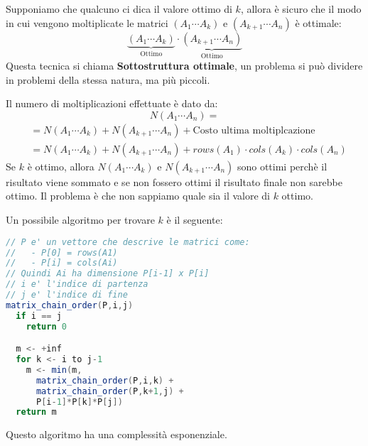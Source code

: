 \documentclass[a4paper]{article}
\begin{document}
\vspace{1em}
\noindent
Supponiamo che qualcuno ci dica il valore ottimo di \( k \), allora è sicuro che
il modo in cui vengono moltiplicate le matrici \( (A_1 \cdots A_k) \) e 
\( (A_{k+1} \cdots A_n) \) è ottimale:
\[
  \underbrace{\left( A_1 \cdots A_k \right)}_{\text{Ottimo}} \cdot 
  \underbrace{\left( A_{k+1} \cdots A_n \right)}_{\text{Ottimo}}
\] 
Questa tecnica si chiama \textbf{Sottostruttura ottimale}, un problema si può dividere in
problemi della stessa natura, ma più piccoli.

\vspace{1em}
\noindent
Il numero di moltiplicazioni effettuate è dato da:
\[
  N\left( A_1 \cdots A_n \right) =
\] 
\[
  \begin{aligned}
         &= N\left( A_1 \cdots A_k \right) +
         N\left( A_{k+1} \cdots A_n \right) +
         \text{Costo ultima moltiplcazione}
         \\
         &= N\left( A_1 \cdots A_k \right) +
         N\left( A_{k+1} \cdots A_n \right) +
         rows(A_1) \cdot cols(A_k) \cdot cols(A_n)
  \end{aligned}
\] 
Se \( k \) è ottimo, allora \( N\left( A_1 \cdots A_k \right) \) e
\( N\left( A_{k+1} \cdots A_n \right) \) sono ottimi perchè il risultato
viene sommato e se non fossero ottimi il risultato finale non sarebbe ottimo.
Il problema è che non sappiamo quale sia il valore di \( k \) ottimo.

\vspace{1em}
\noindent
Un possibile algoritmo per trovare \( k \) è il seguente:
\begin{lstlisting}[language=Scala]
// P e' un vettore che descrive le matrici come:
//   - P[0] = rows(A1)
//   - P[i] = cols(Ai)
// Quindi Ai ha dimensione P[i-1] x P[i]
// i e' l'indice di partenza
// j e' l'indice di fine
matrix_chain_order(P,i,j)
  if i == j
    return 0

  m <- +inf
  for k <- i to j-1
    m <- min(m,
      matrix_chain_order(P,i,k) +
      matrix_chain_order(P,k+1,j) +
      P[i-1]*P[k]*P[j])
  return m
\end{lstlisting}
Questo algoritmo ha una complessità esponenziale.
\end{document}
